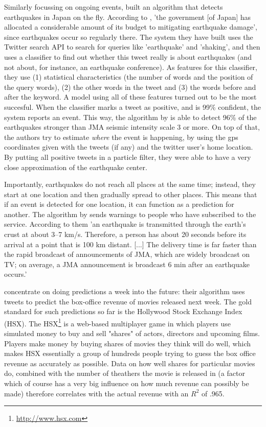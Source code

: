 \documentclass[12pt]{article}
\begin{document}
Similarly focussing on ongoing events,  built an algorithm that detects earthquakes in Japan on the fly. According to , 'the government [of Japan] has allocated a considerable amount of its budget to mitigating earthquake damage', since earthquakes occur so regularly there. The system they have built uses the Twitter search API to search for queries like 'earthquake' and 'shaking', and then uses a classifier to find out whether this tweet really is about earthquakes (and not about, for instance, an earthquake conference). As features for this classifier, they use (1) statistical characteristics (the number of words and the position of the query words), (2) the other words in the tweet and (3) the words before and after the keyword. A model using all of these features turned out to be the most succesful. When the classifier marks a tweet as positive, and is 99\% confident, the system reports an event. This way, the algorithm by  is able to detect 96\% of the earthquakes stronger than JMA seismic intensity scale 3 or more. On top of that, the authors try to estimate \emph{where} the event is happening, by using the gps coordinates given with the tweets (if any) and the twitter user's home location. By putting all positive tweets in a particle filter, they were able to have a very close approximation of the earthquake center. %

Importantly, earthquakes do not reach all places at the same time; instead, they start at one location and then gradually spread to other places. This means that if an event is detected for one location, it can function as a prediction for another. The algorithm by  sends warnings to people who have subscribed to the service. According to them 'an earthquake is transmitted through the earth’s crust at about 3–7 km/s. Therefore, a person has about 20 seconds before its arrival at a point that is 100 km distant. [...] The delivery time is far faster than the rapid broadcast of announcements of JMA, which are widely broadcast on TV; on average, a JMA announcement is broadcast 6 min after an earthquake occurs.'

 concentrate on doing predictions a week into the future: their algorithm uses tweets to predict the box-office revenue of movies released next week. The gold standard for such predictions so far is the Hollywood Stock Exchange Index (HSX). The HSX\footnote{\url{http://www.hsx.com}} is a web-based multiplayer game in which players use simulated money to buy and sell "shares" of actors, directors and upcoming films. Players make money by buying shares of movies they think will do well, which makes HSX essentially a group of hundreds people trying to guess the box office revenue as accurately as possible. Data on how well shares for particular movies do, combined with the number of theathers the movie is released in (a factor which of course has a very big influence on how much revenue can possibly be made) therefore correlates with the actual revenue with an $R^2$ of .965.
\end{document}
